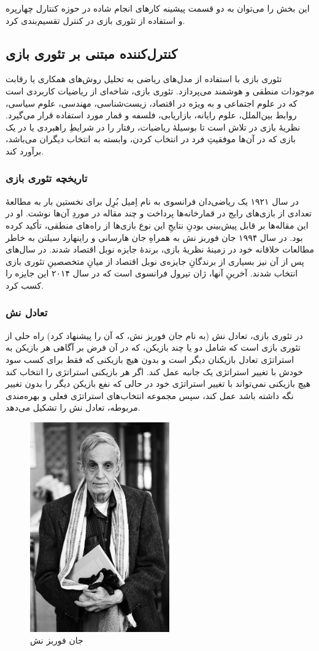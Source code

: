 این بخش را می‌توان به دو قسمت پیشینه کارهای انجام شاده در حوزه کنتارل چهارپره و استفاده از تئوری بازی
در کنترل تقسیم‌بندی کرد.
\subsection{کنترل‌کننده مبتنی بر تئوری بازی}
تئوری بازی با استفاده از مدل‌های ریاضی به تحلیل روش‌های همکاری یا رقابت موجودات منطقی و هوشمند می‌پردازد. تئوری بازی، شاخه‌ای از ریاضیات کاربردی است که در علوم اجتماعی و به ویژه در اقتصاد، زیست‌شناسی، مهندسی، علوم سیاسی، روابط بین‌الملل، علوم رایانه، بازاریابی، فلسفه و قمار مورد استفاده قرار می‌گیرد. نظریهٔ بازی در تلاش است تا بوسیلهٔ ریاضیات، رفتار را در شرایطِ راهبردی یا در یک بازی که در آن‌ها موفقیتِ فرد در انتخاب کردن، وابسته به انتخاب دیگران می‌باشد، برآورد کند.
\subsubsection{تاریخچه تئوری بازی}
در سال ۱۹۲۱ یک ریاضی‌دان فرانسوی به نام اِمیل بُرِل برای نخستین بار به مطالعهٔ تعدادی از بازی‌های رایج در قمارخانه‌ها پرداخت و چند مقاله در موردِ آن‌ها نوشت. او در این مقاله‌ها بر قابل پیش‌بینی بودنِ نتایجِ این نوع بازی‌ها از راه‌های منطقی، تأکید کرده بود. در سال ۱۹۹۴ جان فوربز نش به همراهِ جان هارسانی و راینهارد سیلتن به خاطر مطالعات خلاقانه خود در زمینهٔ نظریهٔ بازی، برندهٔ جایزه نوبل اقتصاد شدند. در سال‌های پس از آن نیز بسیاری از برندگانِ جایزه‌ی نوبل اقتصاد از میانِ متخصصینِ تئوری بازی انتخاب شدند. آخرینِ آنها، ژان تیرول فرانسوی است که در سال ۲۰۱۴ این جایزه را کسب کرد.
\subsubsection{تعادل نش}
در تئوری بازی، تعادل نش (به نام جان فوربز نش، که آن را پیشنهاد کرد) راه حلی از تئوری بازی است که شامل دو یا چند بازیکن، که در آن فرض بر آگاهی هر بازیکن به استراتژی تعادل بازیکنان دیگر است و بدون هیچ بازیکنی که فقط برای کسب سود خودش با تغییر استراتژی یک جانبه عمل کند. اگر هر بازیکنی استراتژی را انتخاب کند هیچ بازیکنی نمی‌تواند با تغییر استراتژی خود در حالی که نفع بازیکن دیگر را بدون تغییر نگه داشته باشد عمل کند، سپس مجموعه انتخاب‌های استراتژی فعلی و بهره‌مندی مربوطه، تعادل نش را تشکیل می‌دهد.
\begin{figure}[H]\label{LabQuad}
	\includegraphics[width=6cm]{figs/introduction/John_Forbes_Nash,_Jr._by_Peter_Badge.jpg}
	\centering
	\caption{جان فوربز نش}
\end{figure}
